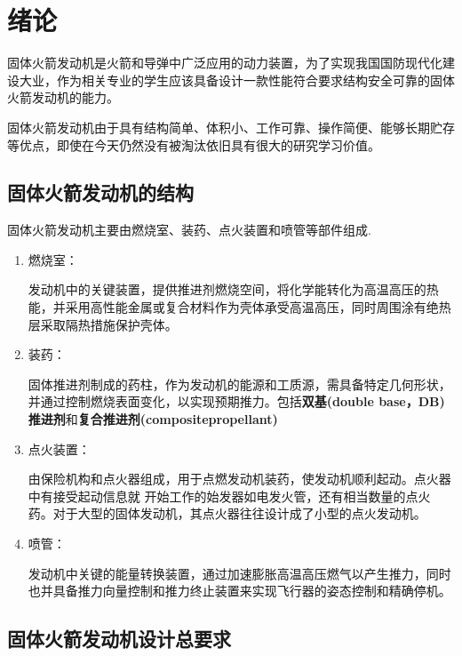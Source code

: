 
\chapter{绪论}

固体火箭发动机是火箭和导弹中广泛应用的动力装置，为了实现我国国防现代化建设大业，作为相关专业的学生应该具备设计一款性能符合要求结构安全可靠的固体火箭发动机的能力。

固体火箭发动机由于具有结构简单、体积小、工作可靠、操作简便、能够长期贮存等优点，即使在今天仍然没有被淘汰依旧具有很大的研究学习价值。

\section{固体火箭发动机的结构}

固体火箭发动机主要由燃烧室、装药、点火装置和喷管等部件组成.

\begin{enumerate}[leftmargin=2em]
  \item 燃烧室：
  
  发动机中的关键装置，提供推进剂燃烧空间，将化学能转化为高温高压的热能，并采用高性能金属或复合材料作为壳体承受高温高压，同时周围涂有绝热层采取隔热措施保护壳体。
  \item 装药：
  
  固体推进剂制成的药柱，作为发动机的能源和工质源，需具备特定几何形状，并通过控制燃烧表面变化，以实现预期推力。包括\textbf{双基(double base，DB)推进剂}和\textbf{复合推进剂(compositepropellant)}

  \item 点火装置：
  
  由保险机构和点火器组成，用于点燃发动机装药，使发动机顺利起动。点火器中有接受起动信息就
  开始工作的始发器如电发火管，还有相当数量的点火药。对于大型的固体发动机，其点火器往往设计成了小型的点火发动机。

  \item 喷管：
  
  发动机中关键的能量转换装置，通过加速膨胀高温高压燃气以产生推力，同时也并具备推力向量控制和推力终止装置来实现飞行器的姿态控制和精确停机。
\end{enumerate}



\section{固体火箭发动机设计总要求}


